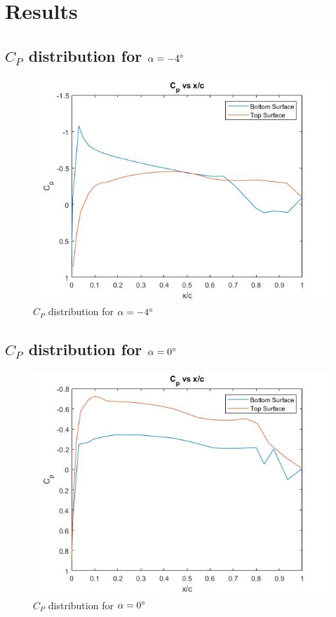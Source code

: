 \documentclass[12pt]{article}
\begin{document}
\newpage
\section{Results}
\subsection{\(C_P\) distribution for \(\alpha = -4\degree\)}
    \begin{figure}[h]
        \includegraphics[width=16 cm]{-4.jpg}
        \centering
        \caption{\(C_P\) distribution for \(\alpha = -4\degree\)}
    \end{figure}
    
    \newpage
    \subsection{\(C_P\) distribution for \(\alpha = 0\degree\)}
    \begin{figure}[h]
        \includegraphics[width=16 cm]{0.jpg}
        \centering
        \caption{\(C_P\) distribution for \(\alpha = 0\degree\)}
    \end{figure}
    
\end{document}
